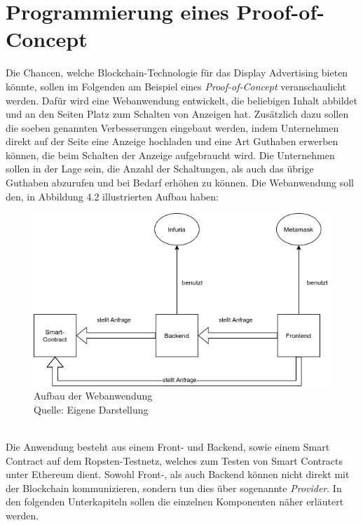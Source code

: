 \section{Programmierung eines Proof-of-Concept}
Die Chancen, welche Blockchain-Technologie für das Display Advertising bieten könnte, sollen im Folgenden am Beispiel eines \emph{Proof-of-Concept} veranschaulicht werden. 
Dafür wird eine Webanwendung entwickelt, die beliebigen Inhalt abbildet und an den Seiten Platz zum Schalten von Anzeigen hat. 
Zusätzlich dazu sollen die soeben genannten Verbesserungen eingebaut werden, indem Unternehmen direkt auf der Seite eine Anzeige hochladen und eine Art Guthaben erwerben können, die beim Schalten der Anzeige aufgebraucht wird. Die Unternehmen sollen in der Lage sein, die Anzahl der Schaltungen, als auch das übrige Guthaben abzurufen und bei Bedarf erhöhen zu können. Die Webanwendung soll den, in Abbildung 4.2 illustrierten Aufbau haben:
\begin{figure}[htpb]
	\centering
	\includegraphics[width=\textwidth]{images/aufbau_PoC.png}
	\caption{Aufbau der Webanwendung\\
	Quelle: Eigene Darstellung}
	\label{6braun:fig:aufbau_poc}
\end{figure}\\
Die Anwendung besteht aus einem Front- und Backend, sowie einem Smart Contract auf dem Ropsten-Testnetz, welches zum Testen von Smart Contracts unter Ethereum dient. Sowohl Front-, als auch Backend können nicht direkt mit der Blockchain kommunizieren, sondern tun dies über sogenannte \emph{Provider}. In den folgenden Unterkapiteln sollen die einzelnen Komponenten näher erläutert werden.
